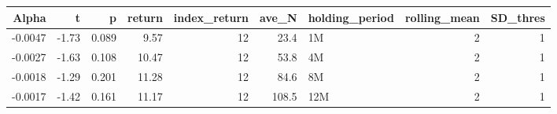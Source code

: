 \begin{table}[ht]
\centering
\begin{tabular}{rrrrrrlrr}
  \hline
Alpha & t & p & return & index\_return & ave\_N & holding\_period & rolling\_mean & SD\_thres \\ 
  \hline
-0.0047 & -1.73 & 0.089 & 9.57 & 12 & 23.4 & 1M &  2 &  1 \\ 
  -0.0027 & -1.63 & 0.108 & 10.47 & 12 & 53.8 & 4M &  2 &  1 \\ 
  -0.0018 & -1.29 & 0.201 & 11.28 & 12 & 84.6 & 8M &  2 &  1 \\ 
  -0.0017 & -1.42 & 0.161 & 11.17 & 12 & 108.5 & 12M &  2 &  1 \\ 
   \hline
\end{tabular}
\end{table}


